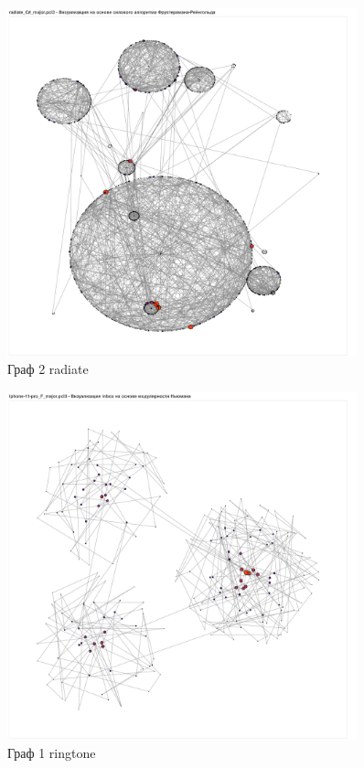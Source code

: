 \begin{figure}[H]
	\caption{Граф 2 radiate}
	\includegraphics[width=0.9\textwidth]{img/radiate2.pdf}
\end{figure}

\begin{figure}[H]
	\caption{Граф 1 ringtone}
	\includegraphics[width=0.9\textwidth]{img/ringtone1.pdf}
\end{figure}

